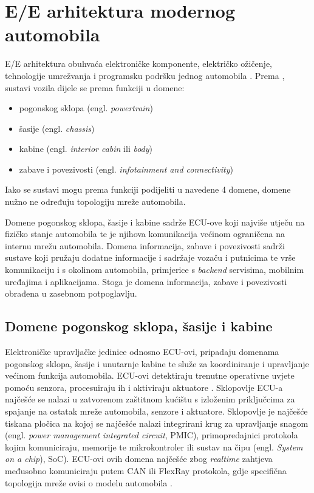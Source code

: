 \documentclass[times, utf8, diplomski, numeric]{fer}
\begin{document}
\section{E/E arhitektura modernog automobila}
E/E arhitektura obuhvaća elektroničke komponente, električko ožičenje, tehnologije umrežvanja i programsku podršku jednog automobila \cite{nasser2023automotive}. Prema \cite{nasser2023automotive, koscher2010, knight2020hacking, huq2020driving, aliwa2021cyberattacks}, sustavi vozila dijele se prema funkciji u domene:

\begin{itemize}
    \item pogonskog sklopa (engl. \textit{powertrain})
    \item šasije (engl. \textit{chassis})
    \item kabine (engl. \textit{interior cabin} ili \textit{body})
    \bigskip
    \item zabave i povezivosti (engl. \textit{infotainment and connectivity})
\end{itemize}

Iako se sustavi mogu prema funkciji podijeliti u navedene 4 domene, domene nužno ne određuju topologiju mreže automobila.

Domene pogonskog sklopa, šasije i kabine sadrže ECU-ove koji najviše utječu na fizičko stanje automobila te je njihova komunikacija većinom ograničena na internu mrežu automobila. Domena informacija, zabave i povezivosti sadrži sustave koji pružaju dodatne informacije i sadržaje vozaču i putnicima te vrše komunikaciju i s okolinom automobila, primjerice s \textit{backend} servisima, mobilnim uređajima i aplikacijama. Stoga je domena informacija, zabave i povezivosti obrađena u zasebnom potpoglavlju.   
\subsection{Domene pogonskog sklopa, šasije i kabine}
Elektroničke upravljačke jedinice odnosno ECU-ovi, pripadaju domenama pogonskog sklopa, šasije i unutarnje kabine te služe za koordiniranje i upravljanje većinom funkcija automobila. ECU-ovi detektiraju trenutne operativne uvjete pomoću senzora, procesuiraju ih i aktiviraju aktuatore \cite{bosch2022handbook}. Sklopovlje ECU-a najčešće se nalazi u zatvorenom zaštitnom kućištu s izloženim priključcima za spajanje na ostatak mreže automobila, senzore i aktuatore. Sklopovlje je najčešće tiskana pločica na kojoj se najčešće nalazi integrirani krug za upravljanje snagom (engl. \textit{power management integrated circuit}, PMIC), primopredajnici protokola kojim komuniciraju, memorije te mikrokontroler ili sustav na čipu (engl. \textit{System on a chip}), SoC)\cite{nasser2023automotive}. ECU-ovi ovih domena najčešće zbog \textit{realtime} zahtjeva međusobno komuniciraju putem CAN ili FlexRay protokola, gdje specifična topologija mreže ovisi o modelu automobila \cite{bosch2022handbook}.
\end{document}
